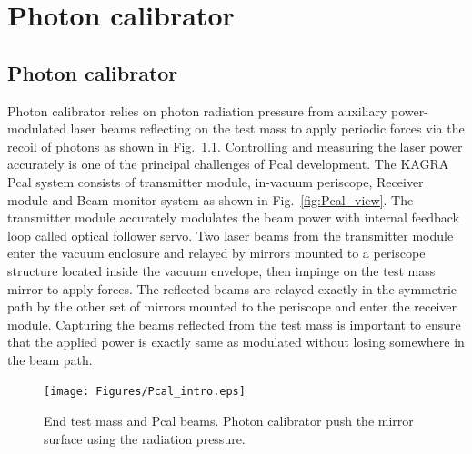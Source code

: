 
\chapter{Photon calibrator} %

\label{Chapter1} %





\section{Photon calibrator}
Photon calibrator relies on photon radiation pressure from auxiliary 
power-modulated laser beams reflecting on the test mass to apply periodic 
forces via the recoil of photons as shown in Fig.~\ref{fig:Pcal_intro}. Controlling and measuring the laser power 
accurately is one of the principal challenges of Pcal development. 
The KAGRA Pcal system consists of transmitter module, in-vacuum periscope, 
Receiver module and Beam monitor system as shown in Fig.~\ref{fig:Pcal_view}. The transmitter module accurately 
modulates the beam power with internal feedback loop called optical follower 
servo. Two laser beams from the transmitter module enter the vacuum enclosure 
and relayed by mirrors mounted to a periscope structure located inside the 
vacuum envelope, then impinge on the test mass mirror to apply forces. 
The reflected beams are relayed exactly in the symmetric path by the 
other set of mirrors mounted to the periscope and enter the receiver module. 
Capturing the beams reflected from the test mass is important to ensure 
that the applied power is exactly same as modulated without losing 
somewhere in the beam path.

\begin{figure}
\begin{center}
\texttt{[image: Figures/Pcal\_intro.eps]}
\caption{End test mass and Pcal beams. Photon calibrator push the mirror surface using the radiation pressure. } 
\label{fig:Pcal_intro} 
\end{center}
\end{figure}

